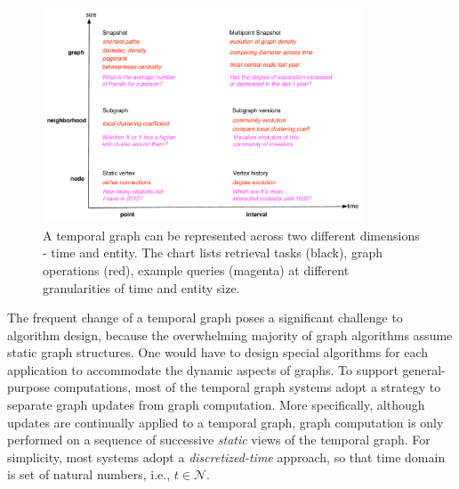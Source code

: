 \documentclass{svjour3}
\begin{document}
\begin{figure}
\centering
\includegraphics [width=0.85\textwidth]{entity-time.pdf}
\caption{A temporal graph can be represented across two different dimensions - time
and entity. The chart lists retrieval tasks (black), graph operations (red), example queries
(magenta) at different granularities of time and entity size.}
\label{fig:et}
\end{figure}



The frequent change of a temporal graph poses a significant challenge to algorithm design, because the overwhelming majority of graph algorithms assume static graph structures. One would have to design special algorithms for each application to accommodate the dynamic aspects of graphs. To support general-purpose computations, most of the temporal graph systems adopt a strategy to separate graph updates from graph computation. More specifically, although updates are continually applied to a temporal graph, graph computation is only performed on a sequence of successive \emph{static} views of the temporal graph. For simplicity, most systems adopt a \emph{discretized-time} approach, so that time domain is set of natural numbers, i.e., $t\in \mathcal{N}$. 

\end{document}

